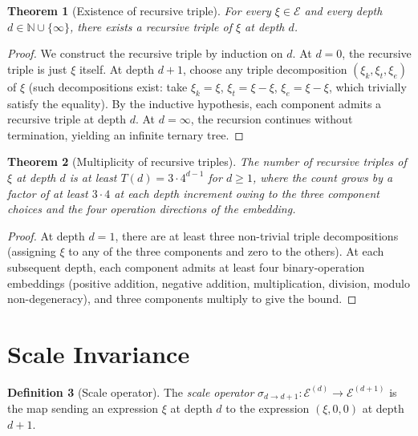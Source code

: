 \documentclass[11pt,a4paper]{article}
\theoremstyle{thmstyle}
\newtheorem{theorem}{Theorem}[section]
\theoremstyle{thmstyle}
\theoremstyle{definition}
\newtheorem{definition}[theorem]{Definition}
\theoremstyle{remark}
\newcommand{\Natural}{\mathbb{N}}
\newcommand{\Expr}{\mathcal{E}}
\begin{document}
\begin{theorem}[Existence of recursive triple]
\label{thm:exist-rec-triple}
For every $\xi \in \Expr$ and every depth $d \in
\Natural \cup \{\infty\}$, there exists a recursive
triple of $\xi$ at depth $d$.
\end{theorem}

\begin{proof}
We construct the recursive triple by induction on
$d$.  At $d = 0$, the recursive triple is just
$\xi$ itself.  At depth $d+1$, choose any triple
decomposition $(\xi_{k}, \xi_{t}, \xi_{e})$ of $\xi$
(such decompositions exist: take $\xi_{k} = \xi$,
$\xi_{t} = \xi - \xi$, $\xi_{e} = \xi - \xi$, which
trivially satisfy the equality).  By the inductive
hypothesis, each component admits a recursive
triple at depth $d$.  At $d = \infty$, the recursion
continues without termination, yielding an
infinite ternary tree.
\end{proof}

\begin{theorem}[Multiplicity of recursive triples]
\label{thm:mult-rec-triple}
The number of recursive triples of $\xi$ at depth $d$
is at least $T(d) = 3 \cdot 4^{d-1}$ for $d \geq 1$,
where the count grows by a factor of at least
$3 \cdot 4$ at each depth increment owing to the three
component choices and the four operation directions
of the embedding.
\end{theorem}

\begin{proof}
At depth $d = 1$, there are at least three
non-trivial triple decompositions (assigning $\xi$ to
any of the three components and zero to the others).
At each subsequent depth, each component admits at
least four binary-operation embeddings (positive
addition, negative addition, multiplication, division,
modulo non-degeneracy), and three components multiply
to give the bound.
\end{proof}

\section{Scale Invariance}
\label{sec:scale-invariance}

\begin{definition}[Scale operator]\label{def:scale-op}
The \emph{scale operator}
$\sigma_{d \to d+1}: \Expr^{(d)} \to \Expr^{(d+1)}$
is the map sending an expression $\xi$ at depth $d$
to the expression $(\xi, 0, 0)$ at depth $d+1$.
\end{definition}
\end{document}
